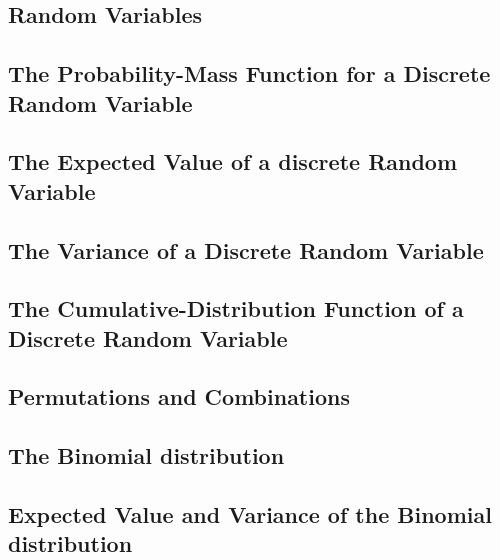 \documentclass[12pt,]{article}
\begin{document}
\hypertarget{random-variables}{%
\subsection{Random Variables}\label{random-variables}}

\hypertarget{the-probability-mass-function-for-a-discrete-random-variable}{%
\subsection{The Probability-Mass Function for a Discrete Random
Variable}\label{the-probability-mass-function-for-a-discrete-random-variable}}

\hypertarget{the-expected-value-of-a-discrete-random-variable}{%
\subsection{The Expected Value of a discrete Random
Variable}\label{the-expected-value-of-a-discrete-random-variable}}

\hypertarget{the-variance-of-a-discrete-random-variable}{%
\subsection{The Variance of a Discrete Random
Variable}\label{the-variance-of-a-discrete-random-variable}}

\hypertarget{the-cumulative-distribution-function-of-a-discrete-random-variable}{%
\subsection{The Cumulative-Distribution Function of a Discrete Random
Variable}\label{the-cumulative-distribution-function-of-a-discrete-random-variable}}

\hypertarget{permutations-and-combinations}{%
\subsection{Permutations and
Combinations}\label{permutations-and-combinations}}

\hypertarget{the-binomial-distribution}{%
\subsection{The Binomial distribution}\label{the-binomial-distribution}}

\hypertarget{expected-value-and-variance-of-the-binomial-distribution}{%
\subsection{Expected Value and Variance of the Binomial
distribution}\label{expected-value-and-variance-of-the-binomial-distribution}}
\end{document}
